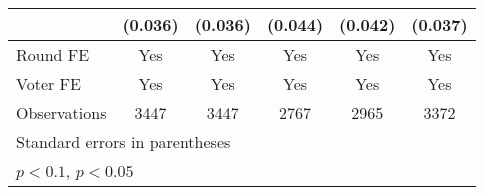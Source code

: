 \begin{table}[htbp]
\begin{tabular}{l*{5}{c}}
                    &     (0.036)       &     (0.036)       &     (0.044)       &     (0.042)       &     (0.037)       \\
[1em]
\hline  Round FE    &         Yes       &         Yes       &         Yes       &         Yes       &         Yes       \\
[1em]
Voter FE            &         Yes       &         Yes       &         Yes       &         Yes       &         Yes       \\
\hline
Observations        &        3447       &        3447       &        2767       &        2965       &        3372       \\
\hline\hline
\multicolumn{6}{l}{\footnotesize Standard errors in parentheses}\\
\multicolumn{6}{l}{\footnotesize \sym{+} \(p<0.1\), \sym{*} \(p<0.05\)}\\
\end{tabular}
\end{table}
